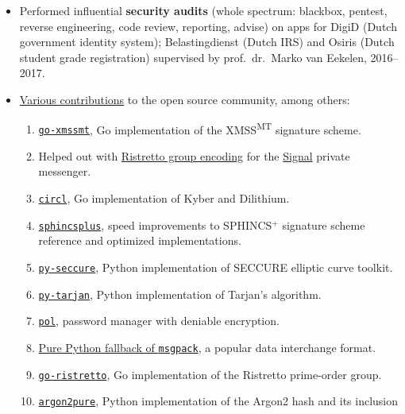\documentclass[a4page]{article}
\newcommand\partitle[1]{\vskip20pt\par\noindent{\textsf{\textbf{#1}}}}
\begin{document}
\partitle{Relevant experience}
\begin{itemize}
    \item Performed influential \textbf{security audits} (whole spectrum:
        blackbox, pentest, reverse
        engineering, code review, reporting, advise)
        on apps for DigiD (Dutch government identity system);
        Belastingdienst (Dutch IRS) 
        and Osiris (Dutch student grade registration)
        supervised by prof.~dr.~Marko van Eekelen,
        2016--2017.
    \item \href{https://github.com/bwesterb}{Various contributions} to the open source community, among others:
        \begin{enumerate}
            \item \href{https://github.com/bwesterb/go-xmssmt}{\texttt{go-xmssmt}}, Go implementation of the XMSS\textsuperscript{MT}
                        signature scheme.
                \item Helped out with
        \href{https://github.com/signalapp/curve25519-dalek/commit/c2320e9137ab1d02234620ed4f3b22371f688db2}{Ristretto
                    group encoding} for the \href{https://signal.org/en/}{Signal} private messenger.
            \item \href{https://github.com/cloudflare/circl}{\texttt{circl}}, Go implementation of
                    Kyber and Dilithium.
            \item \href{https://github.com/sphincs/sphincsplus}{\texttt{sphincsplus}},
                    speed improvements to SPHINCS$^+$ signature scheme reference and optimized implementations.
            \item \href{https://github.com/bwesterb/py-seccure}{\texttt{py-seccure}}, Python implementation of SECCURE elliptic curve toolkit.
            \item \href{https://github.com/bwesterb/py-tarjan}{\texttt{py-tarjan}}, Python implementation of Tarjan's algorithm.
            \item \href{https://github.com/bwesterb/pol}{\texttt{pol}}, password manager with deniable encryption.
            \item \href{https://github.com/msgpack/msgpack-python/pull/42}{Pure Python fallback of \texttt{msgpack}}, a popular data interchange format.
            \item \href{https://github.com/bwesterb/go-ristretto}{\texttt{go-ristretto}}, Go implementation of the Ristretto prime-order group.
            \item \href{https://github.com/bwesterb/argon2pure}{\texttt{argon2pure}}, Python implementation of the Argon2 hash and its inclusion

\end{enumerate}
\end{itemize}
\end{document}
